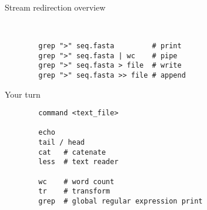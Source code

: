 \documentclass[xcolor=dvipsnames]{beamer}
\begin{document}
\begin{frame}[fragile]
	\huge
	Stream redirection overview
	\Large
	\begin{verbatim}
		
	
		grep ">" seq.fasta         # print
		grep ">" seq.fasta | wc    # pipe
		grep ">" seq.fasta > file  # write
		grep ">" seq.fasta >> file # append
	\end{verbatim}
\end{frame}

\begin{frame}[fragile]
	\huge
	Your turn
	\Large
	\begin{verbatim}
		command <text_file>	
	
		echo
		tail / head
		cat   # catenate
		less  # text reader
		
		wc    # word count
		tr    # transform
		grep  # global regular expression print 
	\end{verbatim}
\end{frame}
\end{document}
